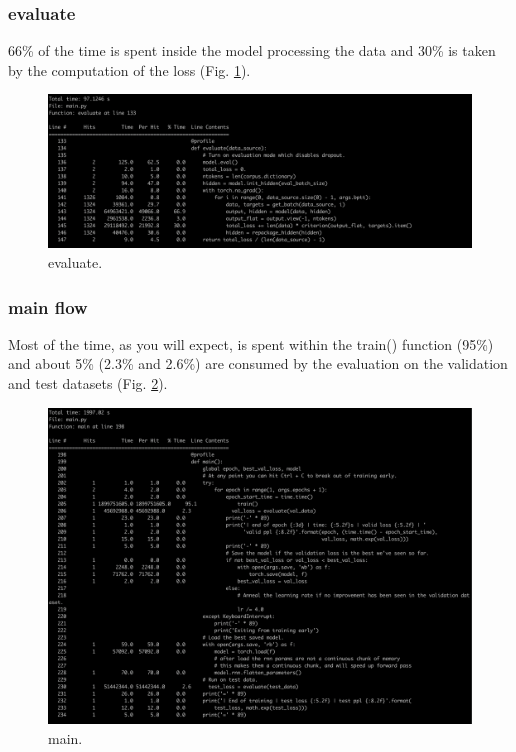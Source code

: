\documentclass[11pt]{article}
\newcommand{\0}{\mat{0}}
\begin{document}
\begin{itemize}
   \subsubsection*{evaluate}
   66\% of the time is spent inside the model processing the data and 30\% is taken by the computation of the loss (Fig. \ref{fig:evaluate}).
   \begin{figure}[ht!]
  	\centering
 	 \includegraphics[width=\linewidth]{evaluate.png}
 	 \caption{evaluate.}
 	 \label{fig:evaluate}
   \end{figure}

  \subsubsection*{main flow}
   Most of the time, as you will expect, is spent within the train() function (95\%) and  about 5\% (2.3\% and 2.6\%)  are consumed by the evaluation on the validation and test datasets (Fig. \ref{fig:main}).
   \begin{figure}[ht!]
  	\centering
 	 \includegraphics[width=\linewidth]{main.png}
 	 \caption{main.}
 	 \label{fig:main}
   \end{figure}


\end{itemize}
\end{document}
